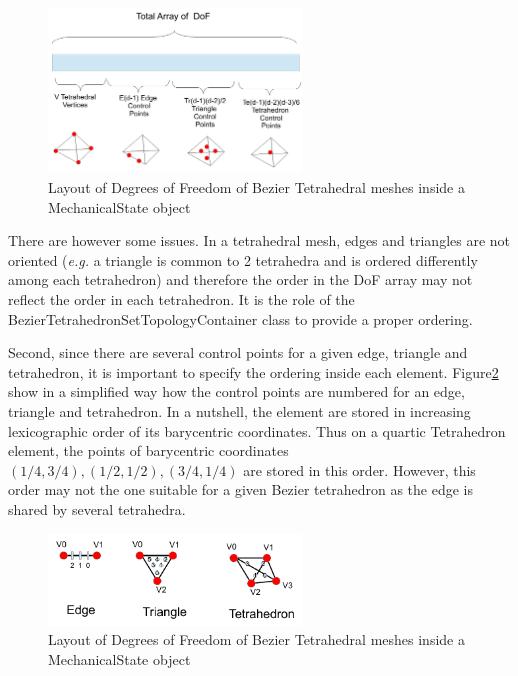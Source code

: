 \documentclass[a4paper,11pt]{article}
\begin{document}
\begin{figure}[!htbp]
	\centering
    \includegraphics[width=0.60\textwidth]{DofLayoutBezierTetrahedron}
	\caption{Layout of Degrees of Freedom of Bezier Tetrahedral meshes inside a MechanicalState object}
	\label{fig:LayoutBezierTetrahedron}
\end{figure}

There are however some issues. In a tetrahedral mesh, edges and triangles are not oriented ({\em e.g.} a triangle is common to 2 tetrahedra and is ordered differently among each tetrahedron) and therefore the order in the DoF array may not reflect the order in each tetrahedron. It is the role of the BezierTetrahedronSetTopologyContainer class to provide a proper ordering.

Second, since there are several control points for a given edge, triangle and tetrahedron, it is important to specify the ordering inside each element. Figure\ref{fig:DofBezierTetrahedronTesselation} show in a simplified way how the control points are numbered for an edge, triangle and tetrahedron. In a nutshell, the element are stored in increasing lexicographic order of its barycentric coordinates. Thus on a quartic Tetrahedron element, the points of barycentric coordinates $(1/4, 3/4), (1/2,1/2), (3/4, 1/4)$ are stored in this order. However, this order may not the one suitable for a given Bezier tetrahedron as the edge is shared by several tetrahedra.

\begin{figure}[!htbp]
	\centering
    \includegraphics[width=0.60\textwidth]{DofBezierTetrahedronTesselation}
	\caption{Layout of Degrees of Freedom of Bezier Tetrahedral meshes inside a MechanicalState object}
	\label{fig:DofBezierTetrahedronTesselation}
\end{figure}
\end{document}
